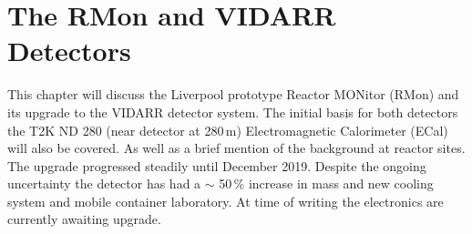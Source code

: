 
\ifpdf
    \graphicspath{{Chapter3/Figs/Raster/}{Chapter3/Figs/PDF/}{Chapter3/Figs/}}
\else
    \graphicspath{{Chapter3/Figs/Vector/}{Chapter3/Figs/}}
\fi


\chapter{The RMon and VIDARR Detectors}\label{Chp:ThePrototypeDetector}
This chapter will discuss the Liverpool prototype Reactor MONitor (RMon) and its upgrade to the VIDARR detector system. The initial basis for both detectors the T2K ND 280 (near detector at 280\,m) Electromagnetic Calorimeter (ECal) will also be covered. As well as a brief mention of the background at reactor sites. The upgrade progressed steadily until December 2019. Despite the ongoing uncertainty the detector has had a $\sim$ 50\,\% increase in mass and new cooling system and mobile container laboratory. At time of writing the electronics are currently awaiting upgrade. 

